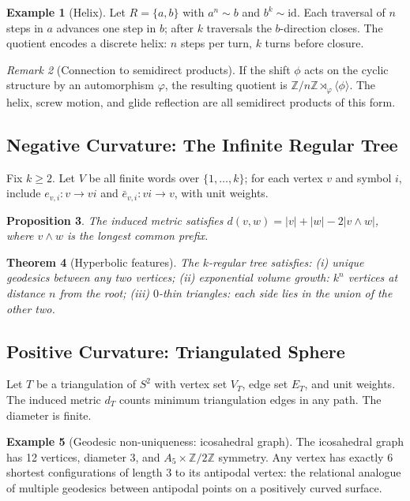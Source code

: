 \documentclass{article}
\newtheorem{theorem}{Theorem}[section]
\newtheorem{proposition}[theorem]{Proposition}
\theoremstyle{definition}
\newtheorem{example}[theorem]{Example}
\theoremstyle{remark}
\newtheorem{remark}[theorem]{Remark}
\newcommand{\id}{\mathrm{id}}
\begin{document}
\begin{example}[Helix]
\label{ex:helix}
Let $R = \{a, b\}$ with $a^n \sim b$ and $b^k \sim \id$.
Each traversal of $n$ steps in $a$ advances one step in $b$;
after $k$ traversals the $b$-direction closes. The quotient
encodes a discrete helix: $n$ steps per turn, $k$ turns before
closure.
\end{example}

\begin{remark}[Connection to semidirect products]
\label{rem:semidirect}
If the shift $\phi$ acts on the cyclic structure by an
automorphism $\varphi$, the resulting quotient is
$\mathbb{Z}/n\mathbb{Z} \rtimes_\varphi \langle \phi \rangle$.
The helix, screw motion, and glide reflection are all semidirect
products of this form.
\end{remark}

\subsection{Negative Curvature: The Infinite Regular Tree}
\label{sec:tree}

Fix $k \geq 2$. Let $V$ be all finite words over $\{1,\dots,k\}$;
for each vertex $v$ and symbol $i$, include $e_{v,i} : v \to vi$
and $\bar{e}_{v,i} : vi \to v$, with unit weights.

\begin{proposition}
The induced metric satisfies
$d(v,w) = |v| + |w| - 2|v \wedge w|$,
where $v \wedge w$ is the longest common prefix.
\end{proposition}

\begin{theorem}[Hyperbolic features]
The $k$-regular tree satisfies: (i) unique geodesics between any
two vertices; (ii) exponential volume growth: $k^n$ vertices at
distance $n$ from the root; (iii) $0$-thin triangles: each side
lies in the union of the other two.
\end{theorem}

\subsection{Positive Curvature: Triangulated Sphere}
\label{sec:sphere}

Let $T$ be a triangulation of $S^2$ with vertex set $V_T$,
edge set $E_T$, and unit weights. The induced metric
$d_T$ counts minimum triangulation edges in any path. The
diameter is finite.

\begin{example}[Geodesic non-uniqueness: icosahedral graph]
\label{ex:icosahedron}
The icosahedral graph has 12 vertices, diameter 3, and
$A_5 \times \mathbb{Z}/2\mathbb{Z}$ symmetry. Any vertex has
exactly 6 shortest configurations of length 3 to its antipodal
vertex: the relational analogue of multiple geodesics between
antipodal points on a positively curved surface.
\end{example}
\end{document}
